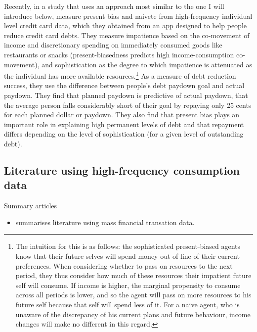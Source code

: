 \documentclass[a4paper, 11pt]{report}
\begin{document}
Recently, in a study that uses an approach most similar to the one I will introduce below, \citet{kuchler2020sticking} measure present bias and naivete from high-frequency individual level credit card data, which they obtained from an app designed to help people reduce credit card debts. They measure impatience based on the co-movement of income and discretionary spending on immediately consumed goods like restaurants or snacks (present-biasedness predicts high income-consumption co-movement), and sophistication as the degree to which impatience is attenuated as the individual has more available resources.\footnote{The intuition for this is as follows: the sophisticated present-biased agents know that their future selves will spend money out of line of their current preferences. When considering whether to pass on resources to the next period, they thus consider how much of these resources their impatient future self will consume. If income is higher, the marginal propensity to consume across all periods is lower, and so the agent will pass on more resources to his future self because that self will spend less of it. For a naive agent, who is unaware of the discrepancy of his current plans and future behaviour, income changes will make no different in this regard.} As a measure of debt reduction success, they use the difference between people's debt paydown goal and actual paydown. They find that planned paydown is predictive of actual paydown, that the average person falls considerably short of their goal by repaying only 25 cents for each planned dollar or paydown. They also find that present bias plays an important role in explaining high permanent levels of debt and that repayment differs depending on the level of sophistication (for a given level of outstanding debt).


\subsection{Literature using high-frequency consumption data}

Summary articles
\begin{itemize}
    \item \citet{baker2021household} summarises literature using mass financial
        transation data.
\end{itemize}
\end{document}
